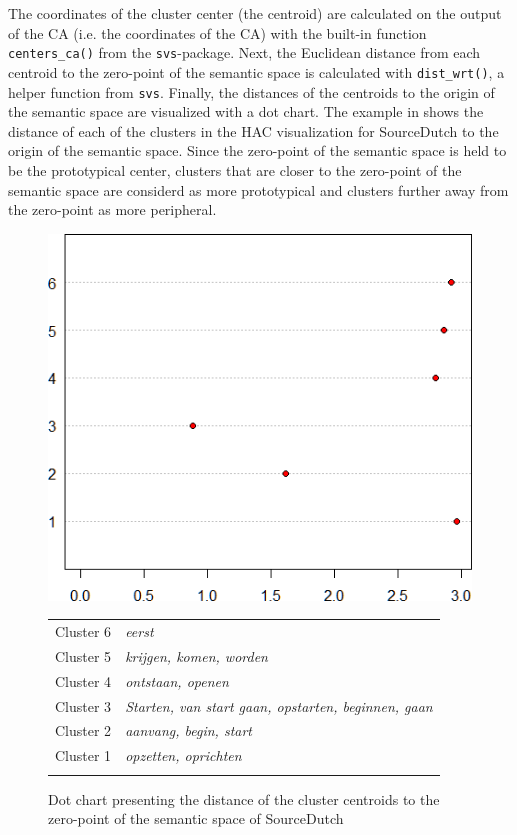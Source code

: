 The coordinates of the cluster center (the centroid) are calculated on the output of the CA (i.e. the coordinates of the CA) with the built-in function \mbox{\texttt{centers\_ca()}} from the \texttt{svs}-package. Next, the Euclidean distance from each centroid to the zero-point of the semantic space is calculated with \mbox{\texttt{dist\_wrt()}}, a helper function from \texttt{svs}. Finally, the distances of the centroids to the origin of the semantic space are visualized with a dot chart. The example in  shows the distance of each of the clusters in the HAC visualization for SourceDutch to the origin of the semantic space. Since the zero-point of the semantic space is held to be the prototypical center, clusters that are closer to the zero-point of the semantic space are considerd as more prototypical and clusters further away from the zero-point as more peripheral. 

\begin{figure}
\includegraphics[height=.4\textheight]{figures/Vandevoorde2-img48.png}\vspace*{\baselineskip}
\scriptsize
\begin{tabular}{l>{\itshape}l}
\lsptoprule
Cluster 6 & eerst\\
Cluster 5 & krijgen{\normalfont,} komen{\normalfont,} worden\\
Cluster 4 & ontstaan{\normalfont,} openen\\
Cluster 3 & Starten{\normalfont,} van start gaan{\normalfont,} opstarten{\normalfont,} beginnen{\normalfont,} gaan\\
Cluster 2 & aanvang{\normalfont,} begin{\normalfont,} start\\
Cluster 1 & opzetten{\normalfont,} oprichten\\
\lspbottomrule
\end{tabular}
\normalsize
\caption{\label{fig:3:48}Dot chart presenting the distance of the cluster centroids to the zero-point of the semantic space of SourceDutch}
\end{figure}

